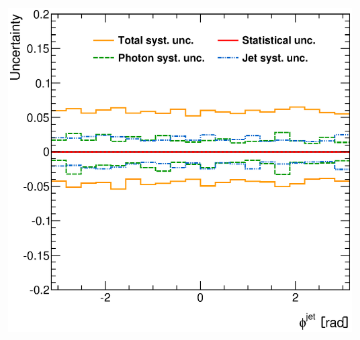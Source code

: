 \documentclass[12pt, twoside]{article}
\numberwithin{equation}{section}
\numberwithin{figure}{section}
\newenvironment{changemargin}[2]{%
\begin{list}{}{%
\setlength{\topsep}{0pt}%
\setlength{\leftmargin}{#1}%
\setlength{\rightmargin}{#2}%
\setlength{\listparindent}{\parindent}%
\setlength{\itemindent}{\parindent}%
\setlength{\parsep}{\parskip}%
}%
\item[]}{\end{list}}
\begin{document}
\begin{figure}
\begin{changemargin}{-1.0cm}{-0.75cm}
\begin{changemargin}{-0.75cm}{-1.0cm}
\begin{subfigure}[b]{0.37\textwidth}
            \subcaption{}
            \label{fig:SystUncerRapidityJet}
        \end{subfigure}
        \begin{subfigure}[b]{0.37\textwidth}
            \includegraphics[width=\textwidth]{./images/TotalSystematicUncertainty/TOT_SYST-106.eps}
            \subcaption{}
            \label{fig:SystUncerPhiJet}
        \end{subfigure}


\end{changemargin}
\end{changemargin}
\end{figure}
\end{document}
